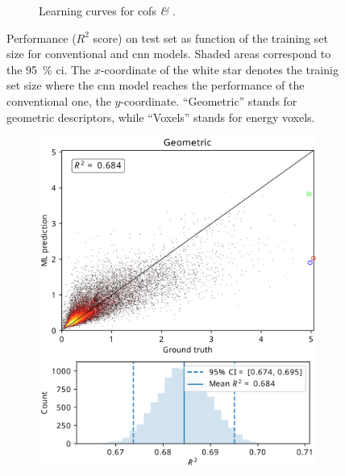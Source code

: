 \begin{figure}
\begin{subfigure}[b]{0.49\textwidth}
		\caption{Learning curves for \glspl{cof} \textit{\&} .}
		\label{fig:learning_curves_cofs}
	\end{subfigure}
	\caption[Learning curves.]{Performance ($R^2$ score) on test set as function
	of the training set size for conventional and \gls{cnn} models. Shaded areas
	correspond to the \SI{95}{\percent} \gls{ci}. The
	$x$-coordinate of the white star denotes the trainig set size where the
	\gls{cnn} model reaches the performance of the conventional one, the
	$y$-coordinate. ``Geometric'' stands for geometric descriptors, while
	``Voxels'' stands for energy voxels.}
	\label{fig:learning_curves_results}
\end{figure}

\begin{figure}
	\centering
	\begin{subfigure}[b]{0.49\textwidth}
		\includegraphics[width=\textwidth]{fig/parity_geom_mofs_annotated.png}
	\end{subfigure}
	\begin{subfigure}[b]{0.49\textwidth}

\end{subfigure}
\end{figure}

